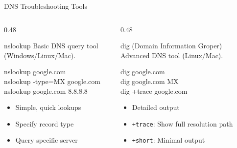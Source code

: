 \documentclass[aspectratio=169, 11pt]{beamer}
\begin{document}
\begin{frame}{DNS Troubleshooting Tools}
    \begin{columns}[T]
        \begin{column}{0.48\textwidth}
            \begin{block}{nslookup}
                \small
                Basic DNS query tool (Windows/Linux/Mac).
                
                \vspace{0.2em}
                \ttfamily\footnotesize
                nslookup google.com \\
                nslookup -type=MX google.com \\
                nslookup google.com 8.8.8.8
                
                \vspace{0.2em}
                \normalfont\small
                \begin{itemize}\setlength{\itemsep}{1pt}
                    \item Simple, quick lookups
                    \item Specify record type
                    \item Query specific server
                \end{itemize}
            \end{block}
        \end{column}
        \begin{column}{0.48\textwidth}
            \begin{block}{dig (Domain Information Groper)}
                \small
                Advanced DNS tool (Linux/Mac).
                
                \vspace{0.2em}
                \ttfamily\footnotesize
                dig google.com \\
                dig google.com MX \\
                dig +trace google.com
                
                \vspace{0.2em}
                \normalfont\small
                \begin{itemize}\setlength{\itemsep}{1pt}
                    \item Detailed output
                    \item \texttt{+trace}: Show full resolution path
                    \item \texttt{+short}: Minimal output
                \end{itemize}
            \end{block}
        \end{column}
    \end{columns}
    

\end{frame}
\end{document}
